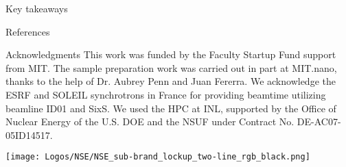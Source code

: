 \begin{column}{\colwidth}
\begin{alertblock}{Key takeaways}

    \end{alertblock}

    \begin{block}{References}
        \nocite{*}
        \footnotesize{}
    \end{block}

    \begin{block}{Acknowledgments}
        \centering
        \footnotesize{
            This work was funded by the Faculty Startup Fund support from MIT.
            The sample preparation work was carried out in part at MIT.nano, thanks to the help of Dr. Aubrey Penn and Juan Fererra.
            We acknowledge the ESRF and SOLEIL synchrotrons in France for providing beamtime utilizing beamline ID01 and SixS.
            We used the HPC at INL, supported by the Office of Nuclear Energy of the U.S. DOE and the NSUF under Contract No. DE-AC07-05ID14517.
        }

        \texttt{[image: Logos/NSE/NSE\_sub-brand\_lockup\_two-line\_rgb\_black.png]}

    \end{block}

\end{column}
